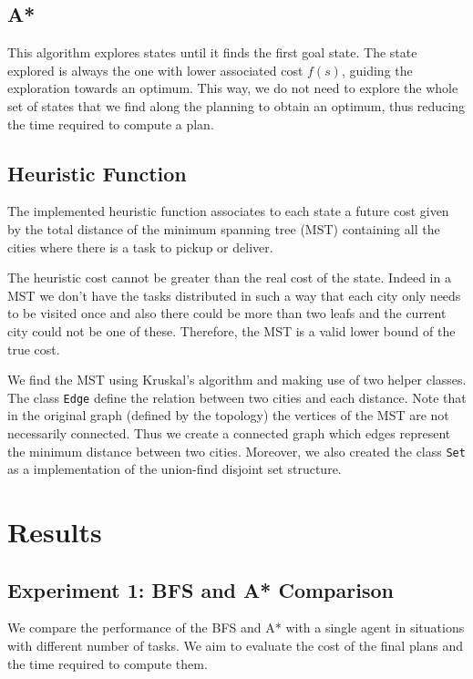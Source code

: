 \documentclass[11pt]{article}
\begin{document}
\subsection{A*}
This algorithm explores states until it finds the first goal state. The state explored is always the one with lower associated cost $f(s)$, guiding the exploration towards an optimum. This way, we do not need to explore the whole set of states that we find along the planning to obtain an optimum, thus reducing the time required to compute a plan.

\subsection{Heuristic Function}
\label{sec:heu}
The implemented heuristic function associates to each state a future cost given by the total distance of the minimum spanning tree (MST) containing all the cities where there is a task to pickup or deliver. 

The heuristic cost cannot be greater than the real cost of the state. Indeed in a MST we don't have the tasks distributed in such a way that each city only needs to be visited once and also there could be more than two leafs and the current city could not be one of these. Therefore, the MST is a valid lower bound of the true cost.

We find the MST using Kruskal's algorithm and making use of two helper classes. The class \texttt{Edge} define the relation between two cities and each distance. Note that in the original graph (defined by the topology) the vertices of the MST are not necessarily connected. Thus we create a connected graph which edges represent the minimum distance between two cities. Moreover, we also created the class \texttt{Set} as a implementation of the union-find disjoint set structure.

\section{Results}

\subsection{Experiment 1: BFS and A* Comparison}
We compare the performance of the BFS and A* with a single agent in situations with different number of tasks. We aim to evaluate the cost of the final plans and the time required to compute them. 
\end{document}
